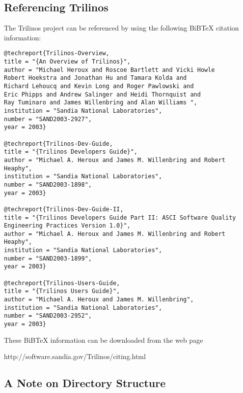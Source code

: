 
\subsection{Referencing Trilinos}
\label{sec:referencing}

The Trilinos project can be referenced by using the following BiBTeX
citation information:
\begin{verbatim}
@techreport{Trilinos-Overview,
title = "{An Overview of Trilinos}",
author = "Michael Heroux and Roscoe Bartlett and Vicki Howle
Robert Hoekstra and Jonathan Hu and Tamara Kolda and
Richard Lehoucq and Kevin Long and Roger Pawlowski and
Eric Phipps and Andrew Salinger and Heidi Thornquist and
Ray Tuminaro and James Willenbring and Alan Williams ",
institution = "Sandia National Laboratories",
number = "SAND2003-2927",
year = 2003}

@techreport{Trilinos-Dev-Guide,
title = "{Trilinos Developers Guide}",
author = "Michael A. Heroux and James M. Willenbring and Robert Heaphy",
institution = "Sandia National Laboratories",
number = "SAND2003-1898",
year = 2003}

@techreport{Trilinos-Dev-Guide-II,
title = "{Trilinos Developers Guide Part II: ASCI Software Quality
Engineering Practices Version 1.0}",
author = "Michael A. Heroux and James M. Willenbring and Robert Heaphy",
institution = "Sandia National Laboratories",
number = "SAND2003-1899",
year = 2003}

@techreport{Trilinos-Users-Guide,
title = "{Trilinos Users Guide}",
author = "Michael A. Heroux and James M. Willenbring",
institution = "Sandia National Laboratories",
number = "SAND2003-2952",
year = 2003}
\end{verbatim}
These BiBTeX information can be downloaded from the web page

\begin{verb}
http://software.sandia.gov/Trilinos/citing.html
\end{verb}


\subsection{A Note on Directory Structure}
\label{sec:into_note}

